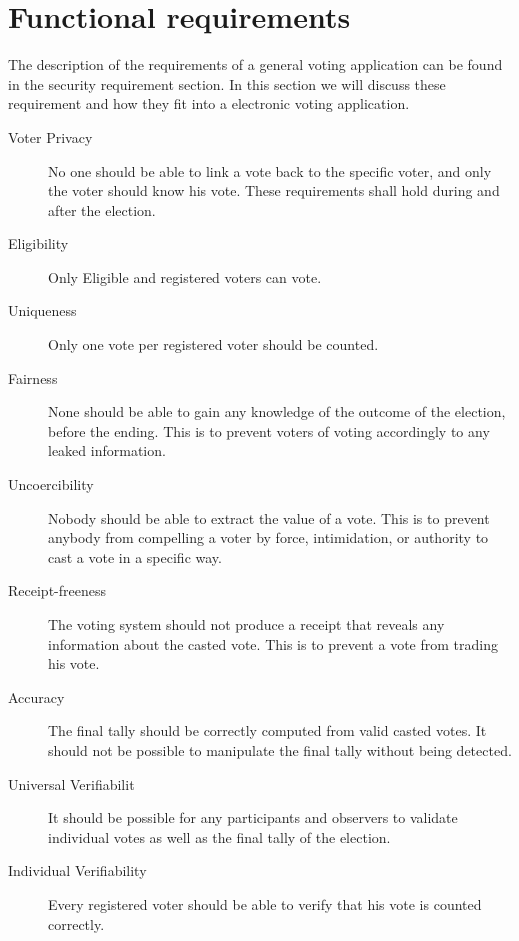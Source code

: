 \section{Functional requirements}
The description of the requirements of a general voting application can be found in the security requirement section. In this section we will discuss these requirement and how they fit into a electronic voting application.





\begin{description}
    \item [Voter Privacy]
        No one should be able to link a vote back to the specific voter, and only the voter should
        know his vote. These requirements shall hold during and after the election.  
    
    \item [Eligibility]    
        Only Eligible and registered voters can vote. 
    
    \item [Uniqueness]
        Only one vote per registered voter should be counted.
    
    \item [Fairness]
        None should be able to gain any knowledge of the outcome of the election, before the ending. This is to prevent voters of voting accordingly to any leaked information. 
    
    \item [Uncoercibility]
        Nobody should be able to extract the value of a vote. This is to prevent anybody from compelling a voter by force, intimidation, or authority to cast a vote in a specific way. 
    
    \item [Receipt-freeness] 
        The voting system should not produce a receipt that reveals any information about the casted vote. This is to prevent a vote from trading his vote. 
    
    \item [Accuracy] 
        The final tally should be correctly computed from valid casted votes. It should not be
        possible to manipulate the final tally without being detected. 
    
    \item [Universal Verifiabilit]
        It should be possible for any participants and observers to validate individual votes as well as the final tally of the election. 
    
    \item [Individual Verifiability]    
        Every registered voter should be able to verify that his vote is counted correctly. 
    
\end{description}

